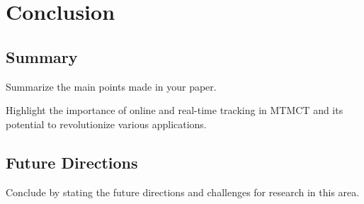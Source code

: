\chapter{Conclusion}\label{chap:conclusion}

\section{Summary}\label{sec:summary}
Summarize the main points made in your paper.

Highlight the importance of online and real-time tracking in MTMCT and its potential to revolutionize various applications.

\section{Future Directions}\label{sec:future_directions}
Conclude by stating the future directions and challenges for research in this area.

